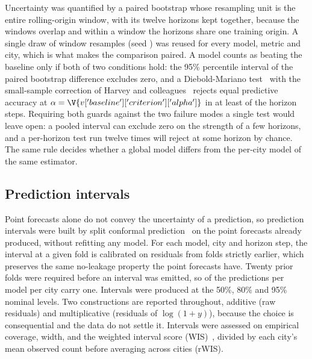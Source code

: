 \documentclass[10pt,letterpaper]{article}
\begin{document}
Uncertainty was quantified by a paired bootstrap whose resampling unit is the entire rolling-origin window, with its twelve horizons kept together, because the windows overlap and within a window the horizons share one training origin. A single draw of  window resamples (seed ) was reused for every model, metric and city, which is what makes the comparison paired. A model counts as beating the baseline only if both of two conditions hold: the 95\% percentile interval of the paired bootstrap difference excludes zero, and a Diebold-Mariano test~\cite{Diebold1995} with the small-sample correction of Harvey and colleagues~\cite{Harvey1997} rejects equal predictive accuracy at $\alpha = \V{v['baseline']['criterion']['alpha']}$ in at least  of the  horizon steps. Requiring both guards against the two failure modes a single test would leave open: a pooled interval can exclude zero on the strength of a few horizons, and a per-horizon test run twelve times will reject at some horizon by chance. The same rule decides whether a global model differs from the per-city model of the same estimator.

\subsection*{Prediction intervals}

Point forecasts alone do not convey the uncertainty of a prediction, so prediction intervals were built by split conformal prediction~\cite{Angelopoulos2021conformal} on the point forecasts already produced, without refitting any model. For each model, city and horizon step, the interval at a given fold is calibrated on residuals from folds strictly earlier, which preserves the same no-leakage property the point forecasts have. Twenty prior folds were required before an interval was emitted, so  of the  predictions per model per city carry one. Intervals were produced at the 50\%, 80\% and 95\% nominal levels. Two constructions are reported throughout, additive (raw residuals) and multiplicative (residuals of $\log(1+y)$), because the choice is consequential and the data do not settle it. Intervals were assessed on empirical coverage, width, and the weighted interval score (WIS)~\cite{Bracher2021wis,Gneiting2007scoring}, divided by each city's mean observed count before averaging across cities (rWIS).
\end{document}
